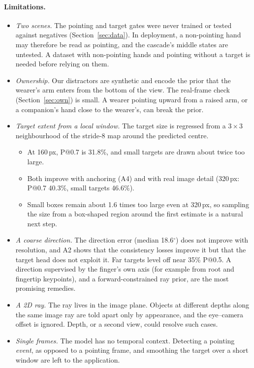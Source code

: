 \paragraph{Limitations.}
\begin{itemize}
\item \emph{Two scenes.} The pointing and target gates were never trained or tested against negatives (Section~\ref{sec:data}). In deployment, a non-pointing hand may therefore be read as pointing, and the cascade's middle states are untested. A dataset with non-pointing hands and pointing without a target is needed before relying on them.
\item \emph{Ownership.} Our distractors are synthetic and encode the prior that the wearer's arm enters from the bottom of the view. The real-frame check (Section~\ref{sec:own}) is small. A wearer pointing upward from a raised arm, or a companion's hand close to the wearer's, can break the prior.
\item \emph{Target extent from a local window.} The target size is regressed from a $3\times3$ neighbourhood of the stride-8 map around the predicted centre.
  \begin{itemize}
  \item At 160\,px, P@0.7 is 31.8\%, and small targets are drawn about twice too large.
  \item Both improve with anchoring (A4) and with real image detail (320\,px: P@0.7 40.3\%, small targets 46.6\%).
  \item Small boxes remain about 1.6 times too large even at 320\,px, so sampling the size from a box-shaped region around the first estimate is a natural next step.
  \end{itemize}
\item \emph{A coarse direction.} The direction error (median 18.6$^\circ$) does not improve with resolution, and A2 shows that the consistency losses improve it but that the target head does not exploit it. Far targets level off near 35\% P@0.5. A direction supervised by the finger's own axis (for example from root and fingertip keypoints), and a forward-constrained ray prior, are the most promising remedies.
\item \emph{A 2D ray.} The ray lives in the image plane. Objects at different depths along the same image ray are told apart only by appearance, and the eye--camera offset is ignored. Depth, or a second view, could resolve such cases.
\item \emph{Single frames.} The model has no temporal context. Detecting a pointing \emph{event}, as opposed to a pointing frame, and smoothing the target over a short window are left to the application.

\end{itemize}

